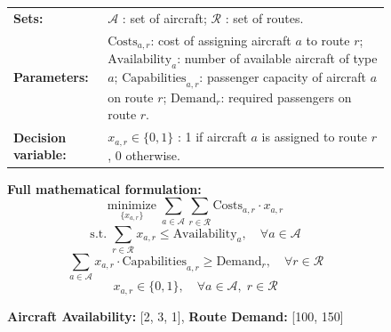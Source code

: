 \documentclass[review,12pt]{elsarticle}
\begin{document}
\begin{figure}[htbp]
{{\begin{tcolorbox}
\begin{tcolorbox}[
    width=\linewidth,
    colframe=form, 
    colback=form!6, 
    title={\textbf{Formulation}}, 
    fonttitle=\bfseries,
    halign title=center,
    boxrule=0.6pt,
    arc=2pt,
    left=1mm, right=1mm, top=0.5mm, bottom=0.5mm,
    before skip=0mm, after skip=0.5mm
]
\setlength{\abovedisplayskip}{1pt}
\setlength{\belowdisplayskip}{1pt}
\vspace{-6mm}
\begin{tabularx}{\linewidth}{@{}lX@{}}
\textbf{Sets:} & $\mathcal{A}$ : set of aircraft; $\mathcal{R}$ : set of routes.\\
\textbf{Parameters:} &
$\text{Costs}_{a,r}$: cost of assigning aircraft $a$ to route $r$; 
$\text{Availability}_a$: number of available aircraft of type $a$; 
$\text{Capabilities}_{a,r}$: passenger capacity of aircraft $a$ on route $r$; 
$\text{Demand}_r$: required passengers on route $r$.\\
\textbf{Decision variable:} &
$x_{a,r} \in \{0,1\}$ : 1 if aircraft $a$ is assigned to route $r$, 0 otherwise.\\
\end{tabularx}
\noindent\textbf{Full mathematical formulation:}
\vspace{-2mm}
\begin{equation}
\underset{\{x_{a,r}\}}{\text{minimize}} \;
\sum_{a \in \mathcal{A}} \sum_{r \in \mathcal{R}} \text{Costs}_{a,r} \cdot x_{a,r}
\end{equation}
\begin{equation}
\text{s.t.} \;
\sum_{r \in \mathcal{R}} x_{a,r} \leq \text{Availability}_a, \quad \forall a \in \mathcal{A}
\end{equation}
\begin{equation}
\sum_{a \in \mathcal{A}} x_{a,r} \cdot \text{Capabilities}_{a,r} \geq \text{Demand}_r, \quad \forall r \in \mathcal{R}
\end{equation}
\vspace{-5mm}
\begin{equation}
x_{a,r} \in \{0, 1\}, \quad \forall a \in \mathcal{A}, \; r \in \mathcal{R}
\end{equation}
\end{tcolorbox}

\begin{tcolorbox}[
    width=\linewidth,
    colframe=data, 
    colback=data!10, 
    title={\textbf{Sample Data}}, 
    fonttitle=\bfseries,
    halign title=center,
    boxrule=0.6pt,
    arc=2pt,
    left=1mm, right=1mm, top=0.5mm, bottom=0.5mm,
    before skip=0mm, after skip=0mm
]
\scriptsize
\textbf{Aircraft Availability:} [2, 3, 1], \textbf{Route Demand:} [100, 150]


\end{tcolorbox}
\end{tcolorbox}}}
\end{figure}
\end{document}
